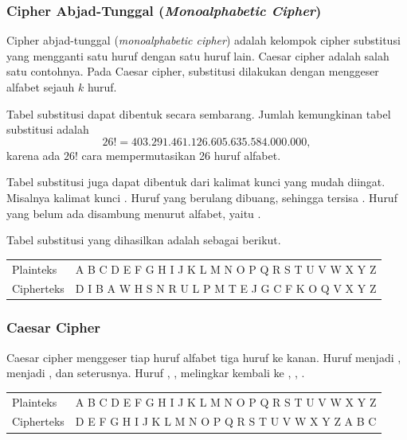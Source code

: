 \subsubsection{Cipher Abjad-Tunggal (\textit{Monoalphabetic Cipher})}

Cipher abjad-tunggal (\textit{monoalphabetic cipher}) adalah kelompok cipher
substitusi yang mengganti satu huruf dengan satu huruf lain. Caesar cipher
adalah salah satu contohnya. Pada Caesar cipher, substitusi dilakukan dengan
menggeser alfabet sejauh $k$ huruf.

Tabel substitusi dapat dibentuk secara sembarang. Jumlah kemungkinan tabel
substitusi adalah
\[ 26! = 403.291.461.126.605.635.584.000.000, \]
karena ada $26!$ cara mempermutasikan 26 huruf alfabet.

Tabel substitusi juga dapat dibentuk dari kalimat kunci yang mudah diingat.
Misalnya kalimat kunci
. Huruf yang
berulang dibuang, sehingga tersisa
. Huruf yang belum ada disambung
menurut alfabet, yaitu .

Tabel substitusi yang dihasilkan adalah sebagai berikut.
\begin{center}
\small
\begin{tabular}{@{}l l@{}}
Plainteks  & A B C D E F G H I J K L M N O P Q R S T U V W X Y Z \\
Cipherteks & D I B A W H S N R U L P M T E J G C F K O Q V X Y Z \\
\end{tabular}
\end{center}

\subsubsection{Caesar Cipher}
\label{sec:caesar}

Caesar cipher menggeser tiap huruf alfabet tiga huruf ke kanan. Huruf
 menjadi ,  menjadi , dan seterusnya. Huruf
, ,  melingkar kembali ke , ,
.
\begin{center}
\small
\begin{tabular}{@{}l l@{}}
Plainteks  & A B C D E F G H I J K L M N O P Q R S T U V W X Y Z \\
Cipherteks & D E F G H I J K L M N O P Q R S T U V W X Y Z A B C \\
\end{tabular}
\end{center}

